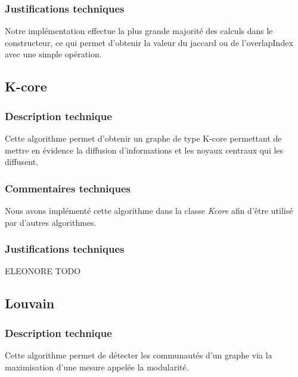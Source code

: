\begin{titlepage}
{\subsubsection{Justifications techniques}
{
Notre implémentation effectue la plus grande majorité des calculs dans le constructeur, ce qui permet d'obtenir la valeur du jaccard ou de l'overlapIndex avec une simple opération.
}

\subsection{K-core}
\subsubsection{Description technique}
{
Cette algorithme permet d'obtenir un graphe de type K-core permettant de mettre en évidence la diffusion d'informations et les noyaux centraux qui les diffusent.
}
\subsubsection{Commentaires techniques}
{
Nous avons implémenté cette algorithme dans la classe \textit{Kcore} afin d'être utilisé par d'autres algorithmes.
}
\subsubsection{Justifications techniques}
{
ELEONORE TODO
}

\subsection{Louvain}
\subsubsection{Description technique}
{
Cette algorithme permet de détecter les communautés d'un graphe via la maximisation d'une mesure appelée la modularité.
}
}
\end{titlepage}
